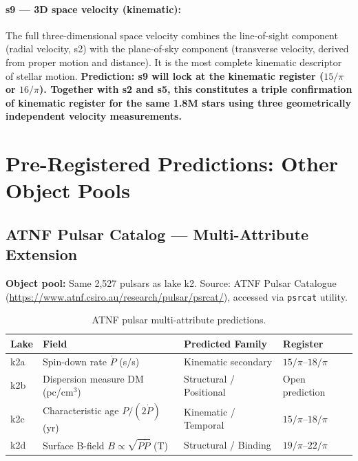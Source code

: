 \documentclass[12pt,a4paper]{article}
\begin{document}
\paragraph{s9 --- 3D space velocity (kinematic):}
The full three-dimensional space velocity combines the line-of-sight component
(radial velocity, s2) with the plane-of-sky component (transverse velocity,
derived from proper motion and distance). It is the most complete kinematic
descriptor of stellar motion. \textbf{Prediction: s9 will lock at the kinematic
register ($15/\pi$ or $16/\pi$). Together with s2 and s5, this constitutes a
triple confirmation of kinematic register for the same 1.8M stars using three
geometrically independent velocity measurements.}

\section{Pre-Registered Predictions: Other Object Pools}
\label{sec:other_pools}

\subsection{ATNF Pulsar Catalog --- Multi-Attribute Extension}

\textbf{Object pool:} Same 2,527 pulsars as lake k2. Source: ATNF Pulsar
Catalogue (\url{https://www.atnf.csiro.au/research/pulsar/psrcat/}), accessed
via \texttt{psrcat} utility.

\begin{table}[h!]
\centering
\caption{ATNF pulsar multi-attribute predictions.}
\begin{tabular}{lp{4.5cm}p{4cm}l}
\toprule
\textbf{Lake} & \textbf{Field} & \textbf{Predicted Family} & \textbf{Register} \\
\midrule
k2a & Spin-down rate $\dot{P}$ (s/s) & Kinematic secondary & $15/\pi$--$18/\pi$ \\
k2b & Dispersion measure DM (pc/cm$^3$) & Structural / Positional & Open prediction \\
k2c & Characteristic age $P/(2\dot{P})$ (yr) & Kinematic / Temporal & $15/\pi$--$18/\pi$ \\
k2d & Surface B-field $B \propto \sqrt{P\dot{P}}$ (T) & Structural / Binding & $19/\pi$--$22/\pi$ \\
\bottomrule
\end{tabular}
\end{table}
\end{document}
